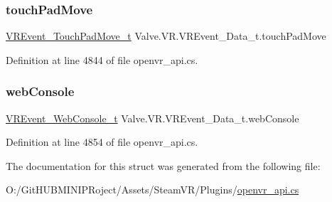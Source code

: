 \subsubsection{\texorpdfstring{touchPadMove}{touchPadMove}}
{\footnotesize\ttfamily \mbox{\hyperlink{struct_valve_1_1_v_r_1_1_v_r_event___touch_pad_move__t}{V\+R\+Event\+\_\+\+Touch\+Pad\+Move\+\_\+t}} Valve.\+V\+R.\+V\+R\+Event\+\_\+\+Data\+\_\+t.\+touch\+Pad\+Move}



Definition at line 4844 of file openvr\+\_\+api.\+cs.

\mbox{\label{struct_valve_1_1_v_r_1_1_v_r_event___data__t_a660f3407b42f3e38a177217028ba5230}} 
\subsubsection{\texorpdfstring{webConsole}{webConsole}}
{\footnotesize\ttfamily \mbox{\hyperlink{struct_valve_1_1_v_r_1_1_v_r_event___web_console__t}{V\+R\+Event\+\_\+\+Web\+Console\+\_\+t}} Valve.\+V\+R.\+V\+R\+Event\+\_\+\+Data\+\_\+t.\+web\+Console}



Definition at line 4854 of file openvr\+\_\+api.\+cs.



The documentation for this struct was generated from the following file\+:\begin{DoxyCompactItemize}
\item 
O\+:/\+Git\+H\+U\+B\+M\+I\+N\+I\+P\+Roject/\+Assets/\+Steam\+V\+R/\+Plugins/\mbox{\hyperlink{openvr__api_8cs}{openvr\+\_\+api.\+cs}}\end{DoxyCompactItemize}
